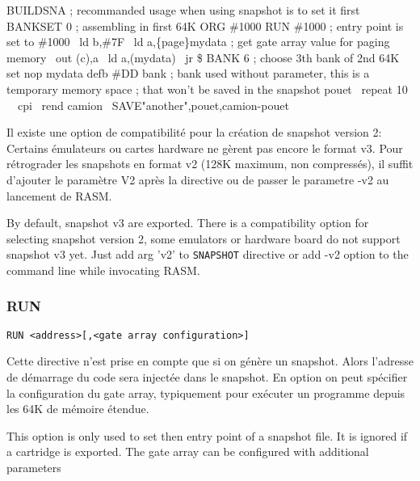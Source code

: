 \begin{code}
BUILDSNA ; recommanded usage when using snapshot is to set it first
BANKSET 0 ; assembling in first 64K
ORG \#1000
RUN \#1000 ; entry point is set to \#1000
\medskip
\ ld b,\#7F
\ ld a,\{page\}mydata ; get gate array value for paging memory
\ out (c),a
\ ld a,(mydata)
\ jr \$
\medskip
BANK 6 ; choose 3th bank of 2nd 64K set
nop
mydata defb \#DD
\medskip
bank
; bank used without parameter, this is a temporary memory space
; that won't be saved in the snapshot
\medskip
pouet
\  repeat 10
\ \ cpi
\ rend
camion
\ SAVE"another",pouet,camion-pouet
\end{code}

\begin{xfr}
Il existe une option de compatibilité pour la création de snapshot version 2: Certains émulateurs ou cartes hardware ne gèrent pas encore le format v3. Pour rétrograder les snapshots en format v2 (128K maximum, non compressés), il suffit d'ajouter le paramètre V2 après la directive ou de passer le parametre -v2 au lancement de RASM.
\end{xfr}

\begin{xen}
By default, snapshot v3 are exported. There is a compatibility option for selecting snapshot version 2, some emulators or hardware board do not support snapshot v3 yet. Just add arg 'v2' to \texttt{SNAPSHOT} directive or add -v2 option to the command line while invocating RASM.
\end{xen}


\begin{xen}
\end{xen}


\subsubsection{RUN}
\begin{verbatim}
RUN <address>[,<gate array configuration>]
\end{verbatim}

\begin{xfr}
Cette directive n'est prise en compte que si on génère un snapshot. Alors l'adresse de démarrage du code sera injectée dans le snapshot. En option on peut spécifier la configuration du gate array, typiquement pour exécuter un programme depuis les 64K de mémoire étendue.
\end{xfr}

\begin{xen}
This option is only used to set then entry point of a snapshot file. It is ignored if a cartridge is exported.
The gate array can be configured with additional parameters
\end{xen}

